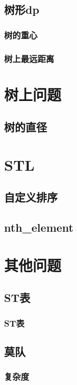 \documentclass[10pt,a4paper]{article}
\begin{document}
\subsection{树形dp}
\subsubsection{树的重心}

\subsubsection{树上最远距离}

\section{树上问题}
\subsection{树的直径}

\section{STL}
\subsection{自定义排序}

\subsection{nth\_element}

\section{其他问题}
\subsection{ST表}
\subsubsection{ST表}

\subsection{莫队}
\subsubsection{复杂度}

\end{document}
